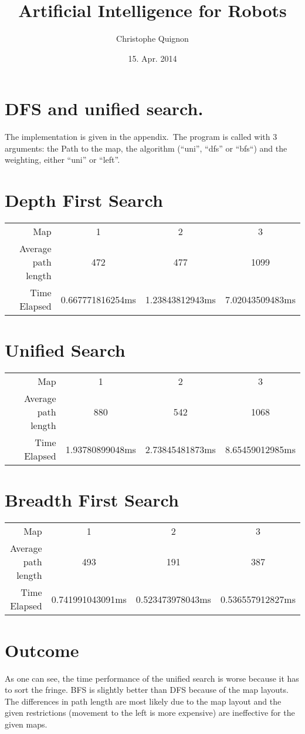 \documentclass{scrreprt}
\author{Christophe Quignon}
\date{15. Apr. 2014}
\title{Artificial Intelligence for Robots}
\begin{document}
\maketitle
\section*{DFS and unified search.}
The implementation is given in the appendix.\
The program is called with 3 arguments: the Path to the map, the algorithm (``uni'', ``dfs'' or ``bfs``) and the weighting, either ``uni'' or ``left''.\

\section*{Depth First Search}
\begin{tabular}{ r | c c c }
  Map 			& 1 			& 2 			& 3\\
  Average path length 	& 472 			& 477 			& 1099\\
  Time Elapsed 		& 0.667771816254ms 	& 1.23843812943ms 	& 7.02043509483ms  \\
\end{tabular}

\section*{Unified Search}
\begin{tabular}{ r | c c c }
  Map 			& 1 			& 2 			& 3\\
  Average path length 	& 880 			& 542 			& 1068\\
  Time Elapsed 		& 1.93780899048ms 	& 2.73845481873ms 	& 8.65459012985ms \\
\end{tabular}

\section*{Breadth First Search}
\begin{tabular}{ r | c c c }
  Map 			& 1 			& 2 			& 3\\
  Average path length 	& 493 			& 191 			& 387\\
  Time Elapsed 		& 0.741991043091ms 	& 0.523473978043ms 	& 0.536557912827ms \\
\end{tabular}

\section*{Outcome}
As one can see, the time performance of the unified search is worse because it has to sort the fringe. BFS is slightly better than DFS because of the map layouts.\\
The differences in path length are most likely due to the map layout and the given restrictions (movement to the left is more expensive) are ineffective for the given maps.\\
\end{document}
